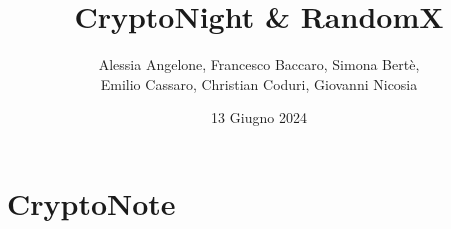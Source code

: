 \documentclass{book}
\title{CryptoNight \& RandomX} %
\author{Alessia Angelone, Francesco Baccaro, Simona Bertè, \\ Emilio Cassaro, Christian Coduri, Giovanni Nicosia}
\date{13 Giugno 2024}
\begin{document}
\maketitle
\tableofcontents


\chapter{CryptoNote}                %






\end{document}
